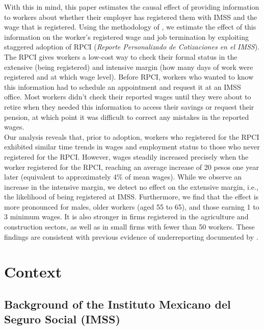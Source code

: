 \documentclass[10pt, oneside]{book}
\begin{document}
With this in mind, this paper estimates the causal effect of providing information to workers about whether their employer has registered them with IMSS and the wage that is registered. Using the methodology of \cite{deChaisemartin2022}, we estimate the effect of this information on the worker's registered wage and job termination by exploiting staggered adoption of RPCI (\textit{Reporte Personalizado de Cotizaciones en el IMSS}). The RPCI gives workers a low-cost way to check their formal status in the extensive (being registered) and intensive margin (how many days of work were registered and at which wage level). Before RPCI, workers who wanted to know this information had to schedule an appointment and request it at an IMSS office. Most workers didn't check their reported wages until they were about to retire when they needed this information to access their savings or request their pension, at which point it was difficult to correct any mistakes in the reported wages. \\

Our analysis reveals that, prior to adoption, workers who registered for the RPCI exhibited similar time trends in wages and employment status to those who never registered for the RPCI. However, wages steadily increased precisely when the worker registered for the RPCI, reaching an average increase of 20 pesos one year later (equivalent to approximately 4\% of mean wages). While we observe an increase in the intensive margin, we detect no effect on the extensive margin, i.e., the likelihood of being registered at IMSS. Furthermore, we find that the effect is more pronounced for males, older workers (aged 55 to 65), and those earning 1 to 3 minimum wages. It is also stronger in firms registered in the agriculture and construction sectors, as well as in small firms with fewer than 50 workers. These findings are consistent with previous evidence of underreporting documented by \cite{kumler2020enlisting}. \\

\chapter{Context} \label{context}

\section{Background of the Instituto Mexicano del Seguro Social (IMSS)}
\end{document}
